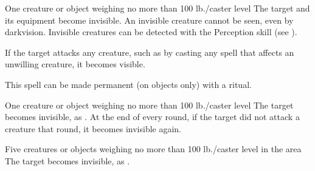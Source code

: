 \spellrng{\rngclose}
\spelldur{\durshort \dismissable}
\begin{spelltarget}{One creature or object weighing no more than 100 lb./caster level}
    \spelleffect The target and its equipment become invisible. An invisible creature cannot be seen, even by darkvision. Invisible creatures can be detected with the Perception skill (see ).

    If the target attacks any creature, such as by casting any spell that affects an unwilling creature, it becomes visible.
\end{spelltarget}
\spellnotes This spell can be made permanent (on objects only) with a  ritual.

\spellrng{\rngclose}
\spelldur{\durshort \dismissable}
\begin{spelltarget}{One creature or object weighing no more than 100 lb./caster level}
    \spelleffect The target becomes invisible, as . At the end of every round, if the target did not attack a creature that round, it becomes invisible again.
\end{spelltarget}

\spelldur{\durshort \dismissable}
\begin{spelltargets}{Five creatures or objects weighing no more than 100 lb./caster level in the area}
    \spelleffect The target becomes invisible, as .
\end{spelltargets}

